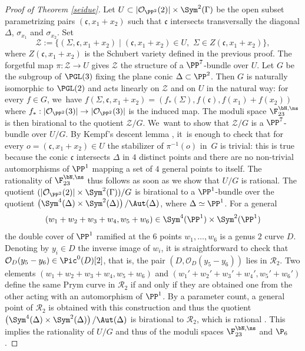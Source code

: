 \begin{proof}[Proof of Theorem \ref{seidue}]
Let $U\subset |\mathcal{O}_{\PP^2}(2)|\times \Sym^2(\Gamma)$ be the open subset parametrizing pairs $(\mathfrak{c}, x_1+x_2)$ such that $\mathfrak{c}$ intersects transversally the diagonal $\Delta$, $\sigma_{x_1}$ and $\sigma_{x_2}$. Set
\[
\mathcal Z:=\bigl\{(\Sigma,\mathfrak{c}, x_1+x_2)\mid (\mathfrak{c}, x_1+x_2)\in U,\,\, \Sigma\in Z(\mathfrak{c}, x_1+x_2) \bigr\},
\]
where $Z(\mathfrak{c}, x_1+x_2)$ is the Schubert variety defined in the previous proof. The forgetful map $\pi:\mathcal Z\to U$ gives $\mathcal Z$ the structure of a $\PP^7$-bundle over $U$. Let $G$ be the subgroup of $\PGL(3)$ fixing the plane conic $\Delta\subset \PP^2$. Then $G$ is naturally isomorphic to $\PGL(2)$ and acts linearly on $\mathcal Z$ and on $U$ in the natural way: for every $f\in G$, we~have $f(\Sigma,\mathfrak{c}, x_1+x_2)=(f_*(\Sigma),f(\mathfrak{c}), f(x_1)+f(x_2))$ where $f_*:|\mathcal{O}_{\PP^2}(3)|\to |\mathcal{O}_{\PP^2}(3)|$ is the induced map. The moduli space $\F_{23}^{\bN,\ns}$ is then birational to the quotient $\mathcal Z / G$. We~want to show that $\mathcal Z / G$ is a $\PP^7$-bundle over $U/G$. By
Kempf's descent lemma \cite{DN}, it~is enough to check that for every $o=(\mathfrak{c}, x_1+x_2)\in U$ the stabilizer of $\pi^{-1}(o)$ in~$G$ is trivial: this is true because the conic $\mathfrak{c}$ intersects $\Delta$ in $4$ distinct points and there are no non-trivial automorphisms of $\PP^1$ mapping a set of $4$ general points to itself. The rationality of $\F_{23}^{\bN,\ns}$ thus follows as soon as we show that $U/G$ is rational. The quotient $(|\mathcal{O}_{\PP^2}(2)|\times \Sym^2(\Gamma))/G$ is birational to a $\PP^1$-bundle over the quotient $\left(\Sym^4(\Delta)\times \Sym^2(\Delta)\right)/\Aut(\Delta)$, where $\Delta\simeq \PP^1$. For a general
\[
(w_1+w_2+w_3+w_4,w_5+w_6)\in\Sym^4(\PP^1)\times \Sym^2(\PP^1)
\]
the double cover of $\PP^1$ ramified at the $6$ points $w_1,\ldots,w_6$ is a genus $2$ curve $D$. Denoting by $y_i\in D$ the inverse image of $w_i$, it is straightforward to check that $\mathcal O_D(y_5- y_6)\in \Pic^0(D)[2]$, that is, the pair $(D,\mathcal O_D(y_5-y_6))$ lies in $\mathcal R_2$. Two elements $(w_1+w_2+w_3+w_4,w_5+w_6)$ and $(w_1'+w_2'+w_3'+w_4',w_5'+w_6')$ define the same Prym curve in $\mathcal R_2$ if and only if they are obtained one from the other acting with an automorphism of $\PP^1$. By a parameter count, a general point of $\mathcal R_2$ is obtained with this construction and thus the quotient $\left(\Sym^4(\Delta)\times \Sym^2(\Delta)\right)/\Aut(\Delta)$ is birational to $\mathcal R_2$, which is rational \cite{Do}. This implies the rationality of $U/G$ and thus of the moduli spaces $\F_{23}^{\bN,\ns}$ and $\P_{6}$.


\end{proof}
